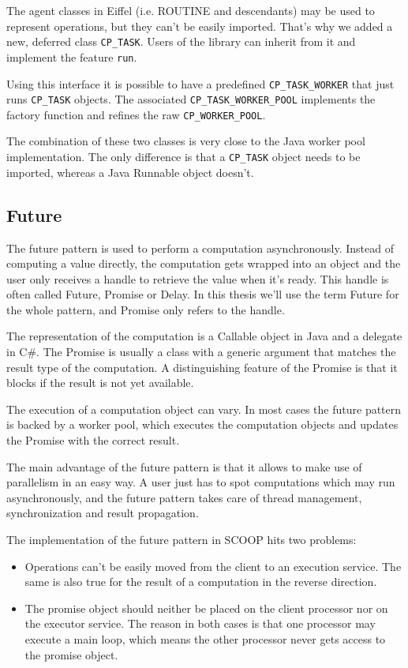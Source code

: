 \documentclass[a4paper,10pt]{report}
\begin{document}
The agent classes in Eiffel (i.e. ROUTINE and descendants) may be used to represent operations, but they can't be easily imported.
That's why we added a new, deferred class \lstinline!CP_TASK!.
Users of the library can inherit from it and implement the feature \lstinline!run!.

Using this interface it is possible to have a predefined \lstinline!CP_TASK_WORKER! that just runs \lstinline!CP_TASK! objects.
The associated \lstinline!CP_TASK_WORKER_POOL! implements the factory function and refines the raw \lstinline!CP_WORKER_POOL!.

The combination of these two classes is very close to the Java worker pool implementation.
The only difference is that a \lstinline!CP_TASK! object needs to be imported, whereas a Java Runnable object doesn't.

\subsection{Future}

The future pattern is used to perform a computation asynchronously.
Instead of computing a value directly, the computation gets wrapped into an object and the user only receives a handle to retrieve the value when it's ready.
This handle is often called Future, Promise or Delay.
In this thesis we'll use the term Future for the whole pattern, and Promise only refers to the handle.

The representation of the computation is a Callable object in Java and a delegate in C\#.
The Promise is usually a class with a generic argument that matches the result type of the computation.
A distinguishing feature of the Promise is that it blocks if the result is not yet available.

The execution of a computation object can vary.
In most cases the future pattern is backed by a worker pool, which executes the computation objects and updates the Promise with the correct result.

The main advantage of the future pattern is that it allows to make use of parallelism in an easy way.
A user just has to spot computations which may run asynchronously, and the future pattern takes care of thread management, synchronization and result propagation.

The implementation of the future pattern in SCOOP hits two problems:
\begin{itemize}
 \item Operations can't be easily moved from the client to an execution service.
 The same is also true for the result of a computation in the reverse direction.
 \item The promise object should neither be placed on the client processor nor on the executor service.
 The reason in both cases is that one processor may execute a main loop, which means the other processor never gets access to the promise object.
\end{itemize}
\end{document}
